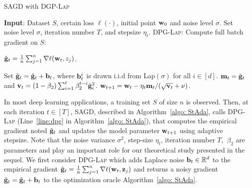 \documentclass[11pt]{article}
\begin{document}
\begin{algorithm}[t] 
\caption{\textsc{SAGD} with \textsc{DGP-Lap}}
\begin{algorithmic}[1] \label{algo: StAda}
\STATE \textbf{Input}: Dataset $S$,  certain loss $\ell(\cdot)$, initial point $\mathbf{w}_0$ and noise level $\sigma$.
\STATE Set  noise level $\sigma$, iteration number $T$,  and stepsize $\eta_t$.
	\STATE  \textsc{DPG-Lap:} Compute full batch gradient on $S$: \\
	\centerline{ $\hat {\mathbf{g}}_t = \frac{1}{n} \sum_{j=1}^n\nabla \ell(\mathbf{w}_t, z_j)$.}	
	\STATE \label{line:dpg} Set $\tilde {\mathbf{g}}_t = \hat {\mathbf{g}}_t + \mathbf{b}_t$, where $\mathbf{b}_t^i$ is drawn i.i.d from Lap$(\sigma)$ for all $i \in [d]$.
\STATE  \label{line:adap1}
$\mathbf{m}_t = \tilde {\mathbf{g}}_t$ and $\mathbf{v}_t = \left(1-\beta_{2}\right) \sum_{i=1}^{t} \beta_{2}^{t-i} \tilde {\mathbf{g}}_{i}^{2}$.
\STATE  \label{line:adap2} $\mathbf{w}_{t+1}=\mathbf{w}_{t}-\eta_t \mathbf{m}_t /(\sqrt{\mathbf{v}_t}+\nu)$.
\ENDFOR 
\end{algorithmic}
\end{algorithm}
In most deep learning applications, a training set $S$ of size $n$ is observed.
Then, at each iteration $t \in [T]$, \textsc{SAGD}, described in Algorithm~\ref{algo: StAda}, calls \textsc{DPG-Lap} (Line~\ref{line:dpg} in Algorithm~\ref{algo: StAda}), that computes the empirical gradient noted $\tilde {\mathbf{g}}_t$ and updates the model parameter $\mathbf{w}_{t+1}$ using adaptive stepsize.
Note that the noise variance $\sigma^2$, step-size $\eta_t$, iteration number $T$, $~ \beta_2$ are parameters and play an important role for our theoretical study presented in the sequel. 
We first consider \textsc{DPG-Lap} which adds Laplace noise $\mathbf{b}_t \in \mathbb{R}^d$ to the empirical gradient $\hat {\mathbf{g}}_t = \frac{1}{n} \sum_{j=1}^n\nabla \ell(\mathbf{w}_t, \mathbf{z}_j)$ and returns a noisy gradient $\tilde {\mathbf{g}}_t = \hat {\mathbf{g}}_t + \mathbf{b}_t$ to the optimization oracle Algorithm~\ref{algo: StAda}.
\end{document}
